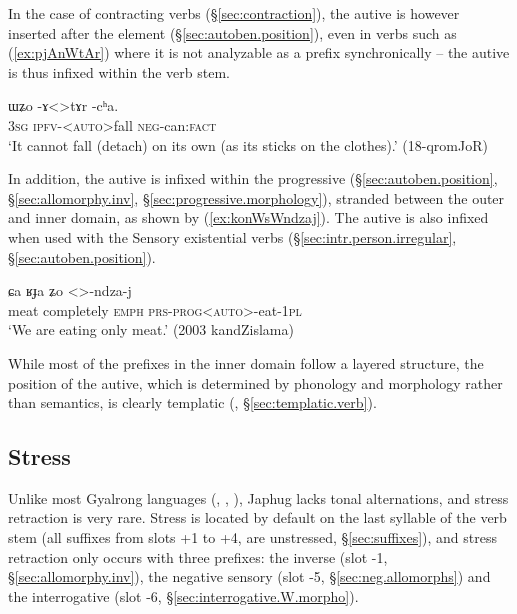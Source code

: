 In the case of contracting verbs (§\ref{sec:contraction}), the autive is however inserted after the  element (§\ref{sec:autoben.position}), even in verbs such as   (\ref{ex:pjAnWtAr}) where it is not analyzable as a prefix synchronically -- the autive is thus infixed within the verb stem.

\begin{exe}
\ex \label{ex:pjAnWtAr}
\gll ɯʑo -ɤ<>tɤr -cʰa. \\
\textsc{3sg} \textsc{ipfv}-<\textsc{auto}>fall \textsc{neg}-can:\textsc{fact} \\
\glt `It cannot fall (detach) on its own (as its sticks on the clothes).' (18-qromJoR) 
\end{exe}

In addition, the autive is infixed within the progressive  (§\ref{sec:autoben.position}, §\ref{sec:allomorphy.inv}, §\ref{sec:progressive.morphology}), stranded between the outer and inner domain, as shown by (\ref{ex:konWsWndzaj}). The autive is also infixed when used with the Sensory existential verbs (§\ref{sec:intr.person.irregular}, §\ref{sec:autoben.position}).

\begin{exe}
\ex \label{ex:konWsWndzaj}
\gll ɕa ʁɟa ʑo <>-ndza-j \\
meat completely \textsc{emph} \textsc{prs}-\textsc{prog}<\textsc{auto}>-eat-\textsc{1pl} \\
\glt `We are eating only meat.' (2003 kandZislama)
\end{exe}

While most of the prefixes in the inner domain follow a layered structure, the position of the autive, which is determined by phonology and morphology rather than semantics, is clearly templatic (\citealt[218]{bickel07inflectional}, §\ref{sec:templatic.verb}).

 

\subsection{Stress} \label{sec:stress.prefixal.chain}
Unlike most Gyalrong languages (\citealt{jackson05yingao}, \citealt{linyj12tone}, \citealt[69--81]{gong18these}), Japhug lacks tonal alternations, and stress retraction is very rare. Stress is located by default on the last syllable of the verb stem (all suffixes from slots +1 to +4, are unstressed, §\ref{sec:suffixes}), and stress retraction only occurs with three prefixes: the inverse   (slot -1, §\ref{sec:allomorphy.inv}), the  negative sensory  (slot -5, §\ref{sec:neg.allomorphs}) and the interrogative  (slot -6, §\ref{sec:interrogative.W.morpho}).

